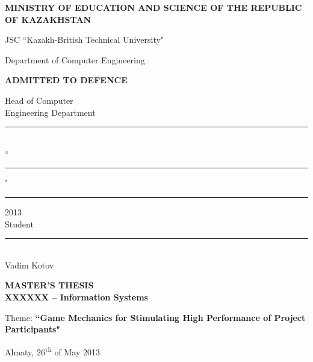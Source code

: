 \begin{titlepage}
	\pagestyle{empty}
	\begin{center}
		{\bf{\MakeUppercase{Ministry of education and science of the republic of Kazakhstan}}

		\vspace{12pt}

		JSC ``Kazakh-British Technical University"


		Department of Computer Engineering}

		\begin{flushright}
			{\bf \MakeUppercase{Admitted to defence}}

			Head of Computer\\
			Engineering Department\\
			\vspace{0.5\baselineskip}
			\rule{13em}{0.4pt}\\

			\vspace{0.5\baselineskip}
			``\rule{2em}{0.4pt}" \rule{8em}{0.4pt} 2013\\
			
			\vspace{1.5\baselineskip}
           Student 
           \vspace{0.5\baselineskip}
           \rule{13em}{0.4pt}\\
           Vadim Kotov
		\end{flushright}
		
		{\bf
		\MakeUppercase{Master's Thesis}\\
		XXXXXX -- Information Systems}

		\vspace{12pt}

		Theme: {\bf ``Game Mechanics for Stimulating High Performance of Project Participants"}

	\end{center}


	\begin{center}
		\vfill
		Almaty, 26\textsuperscript{th} of May 2013
	\end{center}

	\pagebreak


	\begin{center}
		

\end{center}
\end{titlepage}
